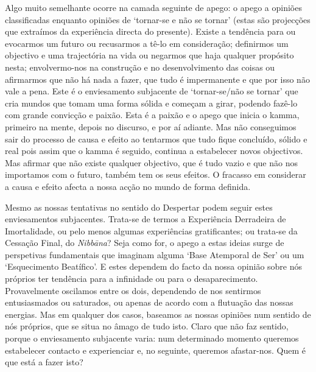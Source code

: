 Algo muito semelhante ocorre na camada seguinte de apego: o apego a opiniões classificadas enquanto opiniões de `tornar-se e não se tornar' (estas são projecções que extraímos da experiência directa do presente). Existe a tendência para ou evocarmos um futuro ou recusarmos a tê-lo em consideração; definirmos um objectivo e uma trajectória na vida ou negarmos que haja qualquer propósito nesta; envolvermo-nos na construção e no desenvolvimento das coisas ou afirmarmos que não há nada a fazer, que tudo é impermanente e que por isso não vale a pena. Este é o enviesamento subjacente de `tornar-se/não se tornar' que cria mundos que tomam uma forma sólida e começam a girar, podendo fazê-lo com grande convicção e paixão. Esta é a paixão e o apego que inicia o kamma, primeiro na mente, depois no discurso, e por aí adiante. Mas não conseguimos sair do processo de causa e efeito ao tentarmos que tudo fique concluído, sólido e real pois assim que o kamma é seguido, continua a estabelecer novos objectivos. Mas afirmar que não existe qualquer objectivo, que é tudo vazio e que não nos importamos com o futuro, também tem os seus efeitos. O fracasso em considerar a causa e efeito afecta a nossa acção no mundo de forma definida.

Mesmo as nossas tentativas no sentido do Despertar podem seguir estes enviesamentos subjacentes. Trata-se de termos a Experiência Derradeira de Imortalidade, ou pelo menos algumas experiências gratificantes; ou trata-se da Cessação Final, do \emph{Nibbāna}? Seja como for, o apego a estas ideias surge de perspetivas fundamentais que imaginam alguma `Base Atemporal de Ser' ou um `Esquecimento Beatífico'. E estes dependem do facto da nossa opinião sobre nós próprios ter tendência para a infinidade ou para o desaparecimento. Provavelmente oscilamos entre os dois, dependendo de nos sentirmos entusiasmados ou saturados, ou apenas de acordo com a flutuação das nossas energias. Mas em qualquer dos casos, baseamos as nossas opiniões num sentido de nós próprios, que se situa no âmago de tudo isto. Claro que não faz sentido, porque o enviesamento subjacente varia: num determinado momento queremos estabelecer contacto e experienciar e, no seguinte, queremos afastar-nos. Quem é que está a fazer isto?

